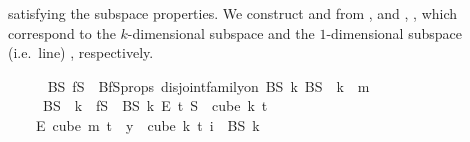 \begin{isabellebody}
\begin{isamarkuptext}
    satisfying the subspace properties. 
    We construct  and  from ,  and
    , , which correspond to the $k$-dimensional subspace  
    and the $1$-dimensional subspace (i.e.\ line) , respectively.%
\end{isamarkuptext}\isamarkuptrue%
%
\endisatagdocument
{\isafolddocument}%
%
\isadelimdocument
%
\endisadelimdocument
%
\isadelimproof
\ \ \ \ %
\endisadelimproof
%
\isatagproof
{}\isamarkupfalse%
\ BS\ fS\ \ BfS{\isacharunderscore}{\kern0pt}props{\isacharcolon}{\kern0pt}\ {\isachardoublequoteopen}disjoint{\isacharunderscore}{\kern0pt}family{\isacharunderscore}{\kern0pt}on\ BS\ {\isacharbraceleft}{\kern0pt}{\isachardot}{\kern0pt}{\isachardot}{\kern0pt}k{\isacharbraceright}{\kern0pt}{\isachardoublequoteclose}\ {\isachardoublequoteopen}{\isasymUnion}{\isacharparenleft}{\kern0pt}BS\ {\isacharbackquote}{\kern0pt}\ {\isacharbraceleft}{\kern0pt}{\isachardot}{\kern0pt}{\isachardot}{\kern0pt}k{\isacharbraceright}{\kern0pt}{\isacharparenright}{\kern0pt}\ {\isacharequal}{\kern0pt}\ {\isacharbraceleft}{\kern0pt}{\isachardot}{\kern0pt}{\isachardot}{\kern0pt}{\isacharless}{\kern0pt}m{\isacharbraceright}{\kern0pt}{\isachardoublequoteclose}\ {\isachardoublequoteopen}{\isacharparenleft}{\kern0pt}{\isacharbraceleft}{\kern0pt}{\isacharbraceright}{\kern0pt}\isanewline
\ \ \ \ {\isasymnotin}\ BS\ {\isacharbackquote}{\kern0pt}\ {\isacharbraceleft}{\kern0pt}{\isachardot}{\kern0pt}{\isachardot}{\kern0pt}{\isacharless}{\kern0pt}k{\isacharbraceright}{\kern0pt}{\isacharparenright}{\kern0pt}{\isachardoublequoteclose}\ {\isachardoublequoteopen}\ fS\ {\isasymin}\ {\isacharparenleft}{\kern0pt}BS\ k{\isacharparenright}{\kern0pt}\ {\isasymrightarrow}\isactrlsub E\ {\isacharbraceleft}{\kern0pt}{\isachardot}{\kern0pt}{\isachardot}{\kern0pt}{\isacharless}{\kern0pt}t{\isacharplus}{\kern0pt}{}{\isacharbraceright}{\kern0pt}{\isachardoublequoteclose}\ {\isachardoublequoteopen}S\ {\isasymin}\ {\isacharparenleft}{\kern0pt}cube\ k\ {\isacharparenleft}{\kern0pt}t{\isacharplus}{\kern0pt}{}{\isacharparenright}{\kern0pt}{\isacharparenright}{\kern0pt}\isanewline
\ \ \ \ {\isasymrightarrow}\isactrlsub E\ {\isacharparenleft}{\kern0pt}cube\ m\ {\isacharparenleft}{\kern0pt}t{\isacharplus}{\kern0pt}{}{\isacharparenright}{\kern0pt}{\isacharparenright}{\kern0pt}\ {\isachardoublequoteclose}\ {\isachardoublequoteopen}{\isacharparenleft}{\kern0pt}{\isasymforall}y\ {\isasymin}\ cube\ k\ {\isacharparenleft}{\kern0pt}t{\isacharplus}{\kern0pt}{}{\isacharparenright}{\kern0pt}{\isachardot}{\kern0pt}\ {\isacharparenleft}{\kern0pt}{\isasymforall}i\ {\isasymin}\ BS\ k{\isachardot}{\kern0pt}\isanewline

\end{isabellebody}
